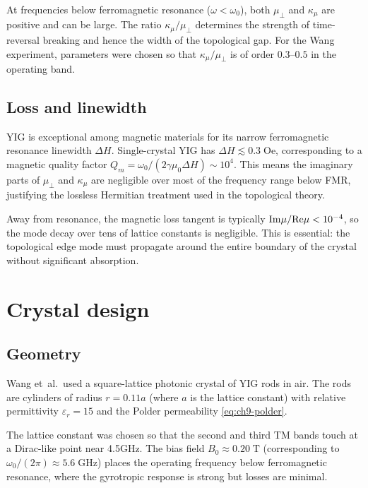 At frequencies below ferromagnetic resonance ($\omega<\omega_0$), both
$\mu_\perp$ and $\kappa_\mu$ are positive and can be large.  The ratio
$\kappa_\mu/\mu_\perp$ determines the strength of time-reversal
breaking and hence the width of the topological gap.  For the Wang
experiment, parameters were chosen so that $\kappa_\mu/\mu_\perp$ is
of order $0.3$--$0.5$ in the operating band.

\subsection{Loss and linewidth}
\label{sec:ch9-loss}

YIG is exceptional among magnetic materials for its narrow
ferromagnetic resonance linewidth $\Delta H$.  Single-crystal YIG has
$\Delta H\lesssim 0.3\;\mathrm{Oe}$, corresponding to a magnetic
quality factor $Q_m=\omega_0/(2\gamma\mu_0\Delta H)\sim 10^4$.  This
means the imaginary parts of $\mu_\perp$ and $\kappa_\mu$ are negligible
over most of the frequency range below FMR, justifying the lossless
Hermitian treatment used in the topological theory.

Away from resonance, the magnetic loss tangent is typically
$\mathrm{Im}\mu/\mathrm{Re}\mu < 10^{-4}$, so the mode decay over tens of lattice
constants is negligible.  This is essential: the topological edge mode
must propagate around the entire boundary of the crystal without
significant absorption.

\section{Crystal design}
\label{sec:ch9-crystal}

\subsection{Geometry}
\label{sec:ch9-geometry}

Wang et~al.\ used a square-lattice photonic crystal of YIG rods in air.
The rods are cylinders of radius $r=0.11a$ (where $a$ is the lattice
constant) with relative permittivity $\varepsilon_r=15$ and the Polder
permeability \eqref{eq:ch9-polder}.

The lattice constant was chosen so that the second and third TM bands
touch at a Dirac-like point near 4.5\;GHz.  The bias field
$B_0\approx 0.20\;\mathrm{T}$ (corresponding to
$\omega_0/(2\pi)\approx 5.6\;\mathrm{GHz}$) places the operating
frequency below ferromagnetic resonance, where the gyrotropic response
is strong but losses are minimal.

